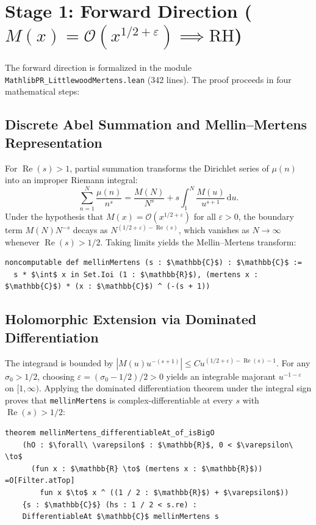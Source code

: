 \documentclass[11pt,a4paper]{article}
\theoremstyle{definition}
\newcommand{\dee}{\mathrm{d}}
\begin{document}
\section{Stage 1: Forward Direction (\texorpdfstring{$M(x) = \mathcal{O}(x^{1/2+\varepsilon}) \implies \mathrm{RH}$}{M(x) = O(x**(1/2+epsilon)) => RH})}
\label{sec:forward}

The forward direction is formalized in the module \texttt{MathlibPR\_LittlewoodMertens.lean} (342 lines). The proof proceeds in four mathematical steps:

\subsection{Discrete Abel Summation and Mellin--Mertens Representation}
For $\operatorname{Re}(s) > 1$, partial summation transforms the Dirichlet series of $\mu(n)$ into an improper Riemann integral:
\begin{equation}
\label{eq:abel_sum}
\sum_{n=1}^N \frac{\mu(n)}{n^s} = \frac{M(N)}{N^s} + s \int_1^N \frac{M(u)}{u^{s+1}}\,\dee u.
\end{equation}
Under the hypothesis that $M(x) = \mathcal{O}(x^{1/2+\varepsilon})$ for all $\varepsilon > 0$, the boundary term $M(N) N^{-s}$ decays as $N^{(1/2+\varepsilon) - \operatorname{Re}(s)}$, which vanishes as $N \to \infty$ whenever $\operatorname{Re}(s) > 1/2$. Taking limits yields the Mellin--Mertens transform:
\begin{lstlisting}
noncomputable def mellinMertens (s : $\mathbb{C}$) : $\mathbb{C}$ :=
  s * $\int$ x in Set.Ioi (1 : $\mathbb{R}$), (mertens x : $\mathbb{C}$) * (x : $\mathbb{C}$) ^ (-(s + 1))
\end{lstlisting}

\subsection{Holomorphic Extension via Dominated Differentiation}
The integrand is bounded by $|M(u) u^{-(s+1)}| \le C u^{(1/2+\varepsilon) - \operatorname{Re}(s) - 1}$. For any $\sigma_0 > 1/2$, choosing $\varepsilon = (\sigma_0 - 1/2)/2 > 0$ yields an integrable majorant $u^{-1 - \varepsilon}$ on $[1, \infty)$. Applying the dominated differentiation theorem under the integral sign proves that \texttt{mellinMertens} is complex-differentiable at every $s$ with $\operatorname{Re}(s) > 1/2$:
\begin{lstlisting}
theorem mellinMertens_differentiableAt_of_isBigO
    (hO : $\forall\ \varepsilon$ : $\mathbb{R}$, 0 < $\varepsilon\ \to$
      (fun x : $\mathbb{R} \to$ (mertens x : $\mathbb{R}$)) =O[Filter.atTop]
        fun x $\to$ x ^ ((1 / 2 : $\mathbb{R}$) + $\varepsilon$))
    {s : $\mathbb{C}$} (hs : 1 / 2 < s.re) :
    DifferentiableAt $\mathbb{C}$ mellinMertens s
\end{lstlisting}
\end{document}
